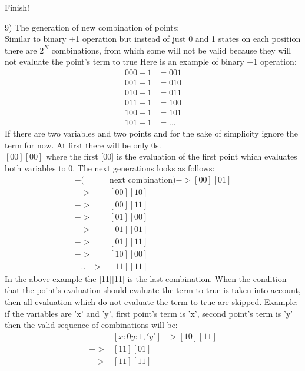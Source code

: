 \documentclass{article}
\begin{document}
			Finish!
			\newline

			9) The generation of new combination of points: \\
				Similar to binary +1 operation but instead of just 0 and 1 states on each position there are $2^N$ combinations,
				from which some will not be valid because they will not evaluate the point's term to true
			\newline
			Here is an example of binary +1 operation:
			\begin{align*}
				000 + 1 &= 001 \\
				001 + 1 &= 010 \\
				010 + 1 &= 011 \\ 
				011 + 1 &= 100 \\
				100 + 1 &= 101 \\
				101 + 1 &= ...
			\end{align*}
			If there are two variables and two points and for the sake of simplicity ignore the term for now.
    			At first there will be only 0s. \\
			$[00][00]$ where the first [00] is the evaluation of the first point which evaluates both variables to 0.
			\newline
			The next generations looks as follows:
			\begin{align*}
				[00][00] -(&\text{next combination})-> [00][01] \\
				->& [00][10] \\
				->& [00][11] \\
				->& [01][00] \\
				->& [01][01] \\
				->& [01][11] \\
				->& [10][00] \\
				-..->& [11][11]
			\end{align*}
			In the above example the [11][11] is the last combination.
			\newline
    			When the condition that the point's evaluation should evaluate the term to true is taken into account, then all evaluation which do not evaluate the 
			term to true are skipped.
			\newline
    			Example: if the variables are 'x' and 'y', first point's term is 'x', second point's term is 'y' then the valid sequence of combinations will be:
			\begin{align*}
				[x:1 y:0, 'x']&[x:0 y:1, 'y'] -> [10][11]  \\
				->& [11][01] \\
				->& [11][11]
			\end{align*} %
			\newline
\end{document}
